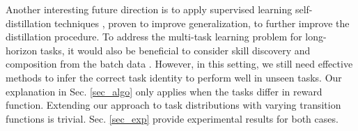 Another interesting future direction is to apply supervised learning self-distillation techniques \cite{xie2019selftraining, mobahi2020selfdistillation}, proven to improve generalization, to further improve the distillation procedure. To address the multi-task learning problem for long-horizon tasks, it would also be beneficial to consider skill discovery and composition from the batch data \cite{peng2019MCP, sharma2020emergent}. However, in this setting, we still need effective methods to infer the correct task identity to perform well in unseen tasks. Our explanation in Sec. \ref{sec_algo} only applies when the tasks differ in reward function. Extending our approach to task distributions with varying transition functions is trivial. Sec. \ref{sec_exp} provide experimental results for both cases.
